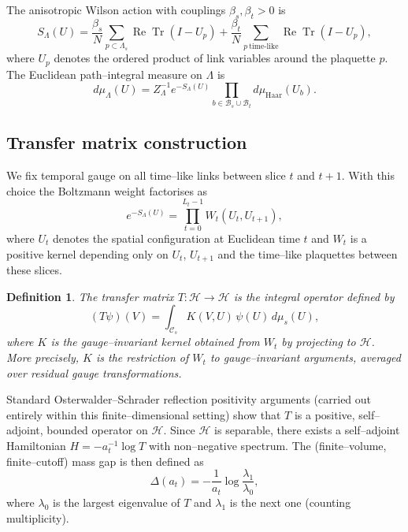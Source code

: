\documentclass[11pt]{article}
\newtheorem{definition}[theorem]{Definition}
\begin{document}
The anisotropic Wilson action with couplings $\beta_s,\beta_t>0$ is
\begin{equation}
  S_\Lambda(U)
  = \frac{\beta_s}{N}\sum_{p\subset\Lambda_s}
      \operatorname{Re}\operatorname{Tr}(I-U_p)
    + \frac{\beta_t}{N}\sum_{p\ \text{time-like}}
      \operatorname{Re}\operatorname{Tr}(I-U_p),
\end{equation}
where $U_p$ denotes the ordered product of link variables around the
plaquette $p$.  The Euclidean path--integral measure on $\Lambda$ is
\[
  d\mu_\Lambda(U)
  = Z_\Lambda^{-1} e^{-S_\Lambda(U)}
    \prod_{b\in\mathcal{B}_s\cup\mathcal{B}_t} d\mu_{\text{Haar}}(U_b).
\]

\subsection{Transfer matrix construction}

We fix temporal gauge on all time--like links between slice $t$ and
$t+1$.  With this choice the Boltzmann weight factorises as
\begin{equation}
  e^{-S_\Lambda(U)}
  = \prod_{t=0}^{L_t-1} W_t(U_t,U_{t+1}),
\end{equation}
where $U_t$ denotes the spatial configuration at Euclidean time $t$ and
$W_t$ is a positive kernel depending only on $U_t$, $U_{t+1}$ and the
time--like plaquettes between these slices.

\begin{definition}
The transfer matrix $T:\mathcal{H}\to\mathcal{H}$ is the integral
operator defined by
\begin{equation}
  (T\psi)(V)
  = \int_{\mathcal{C}_s} K(V,U)\,\psi(U)\,d\mu_s(U),
\end{equation}
where $K$ is the gauge--invariant kernel obtained from $W_t$ by
projecting to $\mathcal{H}$.  More precisely, $K$ is the restriction of
$W_t$ to gauge--invariant arguments, averaged over residual gauge
transformations.
\end{definition}

Standard Osterwalder--Schrader reflection positivity arguments (carried
out entirely within this finite--dimensional setting) show that $T$ is a
positive, self--adjoint, bounded operator on $\mathcal{H}$.  Since
$\mathcal{H}$ is separable, there exists a self--adjoint Hamiltonian
$H=-a_t^{-1}\log T$ with non--negative spectrum.  The (finite--volume,
finite--cutoff) mass gap is then defined as
\begin{equation}
  \Delta(a_t)
  = -\frac{1}{a_t}\log\frac{\lambda_1}{\lambda_0},
\end{equation}
where $\lambda_0$ is the largest eigenvalue of $T$ and $\lambda_1$ is
the next one (counting multiplicity).
\end{document}
